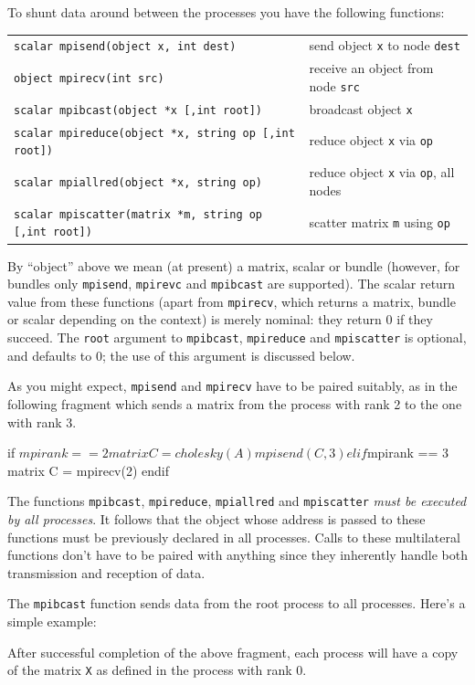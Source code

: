 \documentclass{article}
\begin{document}
To shunt data around between the processes you have the following
functions:
\begin{center}
\begin{tabular}{ll}
\texttt{scalar mpisend(object x, int dest)} & 
  send object \texttt{x} to node \texttt{dest}\\
\texttt{object mpirecv(int src)} & 
  receive an object from node \texttt{src} \\
\texttt{scalar mpibcast(object *x [,int root])} & 
  broadcast object \texttt{x} \\
\texttt{scalar mpireduce(object *x, string op [,int root])} & 
  reduce object \texttt{x} via \texttt{op} \\
\texttt{scalar mpiallred(object *x, string op)} & 
  reduce object \texttt{x} via \texttt{op}, all nodes \\
\texttt{scalar mpiscatter(matrix *m, string op [,int root])} & 
  scatter matrix \texttt{m} using \texttt{op} \\
\end{tabular}
\end{center}
By ``object'' above we mean (at present) a matrix, scalar or bundle
(however, for bundles only \texttt{mpisend}, \texttt{mpirevc} and
\texttt{mpibcast} are supported).  The scalar return value from these
functions (apart from \texttt{mpirecv}, which returns a matrix, bundle
or scalar depending on the context) is merely nominal: they return 0
if they succeed. The \texttt{root} argument to \texttt{mpibcast},
\texttt{mpireduce} and \texttt{mpiscatter} is optional, and defaults
to 0; the use of this argument is discussed below.

As you might expect, \texttt{mpisend} and \texttt{mpirecv} have to be
paired suitably, as in the following fragment which sends a matrix
from the process with rank 2 to the one with rank 3.
\begin{code}
if $mpirank == 2
  matrix C = cholesky(A)
  mpisend(C, 3)
elif $mpirank == 3
  matrix C = mpirecv(2)
endif
\end{code}

The functions \texttt{mpibcast}, \texttt{mpireduce},
\texttt{mpiallred} and \texttt{mpiscatter} \textit{must be executed by
  all processes}. It follows that the object whose address is passed
to these functions must be previously declared in all processes. Calls
to these multilateral functions don't have to be paired with anything
since they inherently handle both transmission and reception of data.

The \texttt{mpibcast} function sends data from the root process to all
processes. Here's a simple example:
After successful completion of the above fragment, each process will
have a copy of the matrix \texttt{X} as defined in the process with
rank 0.
\end{document}
